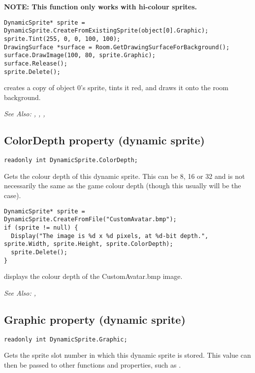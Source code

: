 \bf{NOTE:} This function only works with hi-colour sprites.

\begin{verbatim}
DynamicSprite* sprite = DynamicSprite.CreateFromExistingSprite(object[0].Graphic);
sprite.Tint(255, 0, 0, 100, 100);
DrawingSurface *surface = Room.GetDrawingSurfaceForBackground();
surface.DrawImage(100, 80, sprite.Graphic);
surface.Release();
sprite.Delete();
\end{verbatim}
creates a copy of object 0's sprite, tints it red, and draws it onto the room background.

\it{See Also:} ,
,
,


\subsection{ColorDepth property (dynamic sprite)}\label{DynamicSprite.ColorDepth}%

\begin{verbatim}
readonly int DynamicSprite.ColorDepth;
\end{verbatim}
Gets the colour depth of this dynamic sprite. This can be 8, 16 or 32 and is not necessarily the same
as the game colour depth (though this usually will be the case).

\begin{verbatim}
DynamicSprite* sprite = DynamicSprite.CreateFromFile("CustomAvatar.bmp");
if (sprite != null) {
  Display("The image is %d x %d pixels, at %d-bit depth.", sprite.Width, sprite.Height, sprite.ColorDepth);
  sprite.Delete();
}
\end{verbatim}
displays the colour depth of the CustomAvatar.bmp image.

\it{See Also:} ,


\subsection{Graphic property (dynamic sprite)}\label{DynamicSprite.Graphic}%

\begin{verbatim}
readonly int DynamicSprite.Graphic;
\end{verbatim}
Gets the sprite slot number in which this dynamic sprite is stored.
This value can then be passed to other functions and properties, such as
.

